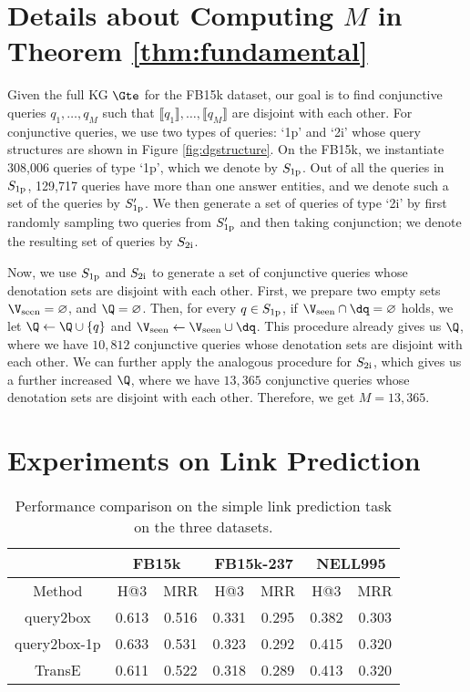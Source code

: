\section{Details about Computing $M$ in Theorem \ref{thm:fundamental}}
\label{app:calculate_m}
Given the full KG $\Gte$ for the FB15k dataset, our goal is to find conjunctive queries $q_1, \ldots, q_M$ such that $\llbracket q_1\rrbracket, \ldots, \llbracket q_M\rrbracket$ are disjoint with each other.
For conjunctive queries, we use two types of queries: `1p' and `2i' whose query structures are shown in Figure \ref{fig:dgstructure}. 
On the FB15k, we instantiate 308,006 queries of type `1p', which we denote by $S_{\rm 1p}$. Out of all the queries in $S_{\rm 1p}$, 129,717 queries have more than one answer entities, and we denote such a set of the queries by $S^{\prime}_{\rm 1p}$.
We then generate a set of queries of type `2i' by first randomly sampling two queries from $S^{\prime}_{\rm 1p}$ and then taking conjunction; we denote the resulting set of queries by $S_{\rm 2i}$.

Now, we use $S_{\rm 1p}$ and $S_{\rm 2i}$ to generate a set of conjunctive queries whose denotation sets are disjoint with each other.
First, we prepare two empty sets $\V_{\rm seen} = \varnothing$, and $\Q = \varnothing$. 
Then, for every $q \in S_{\rm 1p}$, if $\V_{\rm seen} \cap \dq = \varnothing$ holds, we let $\Q \leftarrow \Q \cup \{q\}$ and $\V_{\rm seen} \leftarrow \V_{\rm seen} \cup \dq$. This procedure already gives us $\Q$, where we have $10,812$ conjunctive queries whose denotation sets are disjoint with each other.
We can further apply the analogous procedure for $S_{\rm 2i}$, which gives us a further increased $\Q$, where we have $13,365$ conjunctive queries whose denotation sets are disjoint with each other. Therefore, we get $M = 13,365$.

\section{Experiments on Link Prediction} \label{app:linkpred}

\begin{table*}[!h]
\centering
\begin{tabular}{|c|c|c|c|c|c|c|}
\hline
             & \multicolumn{2}{c|}{FB15k} & \multicolumn{2}{c|}{FB15k-237} & \multicolumn{2}{c|}{NELL995} \\ \hline
Method       & H@3          & MRR         & H@3            & MRR           & H@3           & MRR          \\ \hline
query2box    & 0.613        & 0.516       & 0.331          & 0.295         & 0.382            & 0.303           \\ \hline
query2box-1p & 0.633        & 0.531       & 0.323          & 0.292         & 0.415            & 0.320           \\ \hline
TransE       & 0.611        & 0.522       & 0.318          & 0.289         & 0.413            & 0.320           \\ \hline
\end{tabular}
\caption{Performance comparison on the simple link prediction task on the three datasets.}
\label{tab:linkpred}
\end{table*}


